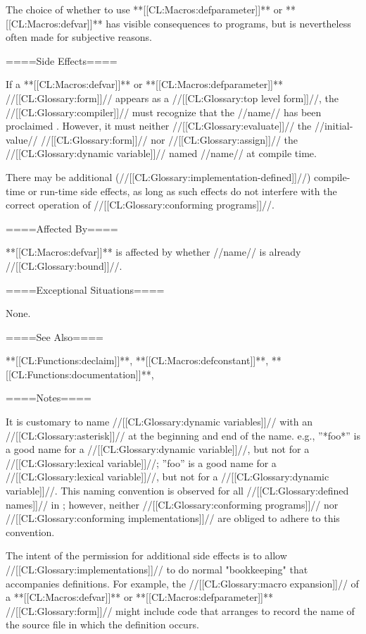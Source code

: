 The choice of whether to use **[[CL:Macros:defparameter]]** or **[[CL:Macros:defvar]]** has visible consequences to programs, but is nevertheless often made for subjective reasons.

====Side Effects====

If a **[[CL:Macros:defvar]]** or **[[CL:Macros:defparameter]]** //[[CL:Glossary:form]]// appears as a //[[CL:Glossary:top level form]]//, the //[[CL:Glossary:compiler]]// must recognize that the //name// has been proclaimed . However, it must neither //[[CL:Glossary:evaluate]]// the //initial-value// //[[CL:Glossary:form]]// nor //[[CL:Glossary:assign]]// the //[[CL:Glossary:dynamic variable]]// named //name// at compile time.

There may be additional (//[[CL:Glossary:implementation-defined]]//) compile-time or run-time side effects, as long as such effects do not interfere with the correct operation of //[[CL:Glossary:conforming programs]]//.

====Affected By====

**[[CL:Macros:defvar]]** is affected by whether //name// is already //[[CL:Glossary:bound]]//.

====Exceptional Situations====

None.

====See Also====

**[[CL:Functions:declaim]]**, **[[CL:Macros:defconstant]]**, **[[CL:Functions:documentation]]**, {\secref\Compilation}

====Notes====

It is customary to name //[[CL:Glossary:dynamic variables]]// with an //[[CL:Glossary:asterisk]]// at the beginning and end of the name. e.g., ''*foo*'' is a good name for a //[[CL:Glossary:dynamic variable]]//, but not for a //[[CL:Glossary:lexical variable]]//; ''foo'' is a good name for a //[[CL:Glossary:lexical variable]]//, but not for a //[[CL:Glossary:dynamic variable]]//. This naming convention is observed for all //[[CL:Glossary:defined names]]// in \clisp; however, neither //[[CL:Glossary:conforming programs]]// nor //[[CL:Glossary:conforming implementations]]// are obliged to adhere to this convention.

The intent of the permission for additional side effects is to allow //[[CL:Glossary:implementations]]// to do normal "bookkeeping" that accompanies definitions. For example, the //[[CL:Glossary:macro expansion]]// of a **[[CL:Macros:defvar]]** or **[[CL:Macros:defparameter]]** //[[CL:Glossary:form]]// might include code that arranges to record the name of the source file in which the definition occurs.

